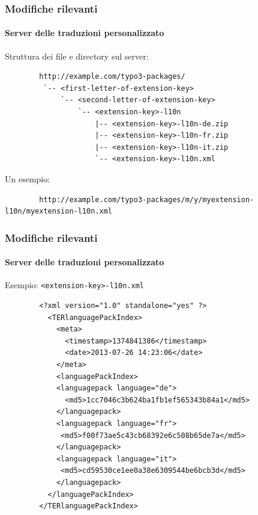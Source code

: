
\begin{frame}[fragile]
	\frametitle{Modifiche rilevanti}
	\framesubtitle{Server delle traduzioni personalizzato}

	Struttura dei file e directory sul server:

	\begin{lstlisting}
		http://example.com/typo3-packages/
		 `-- <first-letter-of-extension-key>
		     `-- <second-letter-of-extension-key>
		         `-- <extension-key>-l10n
		             |-- <extension-key>-l10n-de.zip
		             |-- <extension-key>-l10n-fr.zip
		             |-- <extension-key>-l10n-it.zip
		             `-- <extension-key>-l10n.xml
	\end{lstlisting}

	Un esempio:

	\begin{lstlisting}
		http://example.com/typo3-packages/m/y/myextension-l10n/myextension-l10n.xml
	\end{lstlisting}

\end{frame}


\begin{frame}[fragile]
	\frametitle{Modifiche rilevanti}
	\framesubtitle{Server delle traduzioni personalizzato}

	Esempio: \texttt{<extension-key>-l10n.xml}

	\lstset{
		basicstyle=\tiny\ttfamily
	}

	\begin{lstlisting}
		<?xml version="1.0" standalone="yes" ?>
		  <TERlanguagePackIndex>
		    <meta>
		      <timestamp>1374841386</timestamp>
		      <date>2013-07-26 14:23:06</date>
		    </meta>
		    <languagePackIndex>
		    <languagepack language="de">
		      <md5>1cc7046c3b624ba1fb1ef565343b84a1</md5>
		    </languagepack>
		    <languagepack language="fr">
		     <md5>f00f73ae5c43cb68392e6c508b65de7a</md5>
		    </languagepack>
		    <languagepack language="it">
		     <md5>cd59530ce1ee0a38e6309544be6bcb3d</md5>
		    </languagepack>
		  </languagePackIndex>
		</TERlanguagePackIndex>
	\end{lstlisting}

\end{frame}

